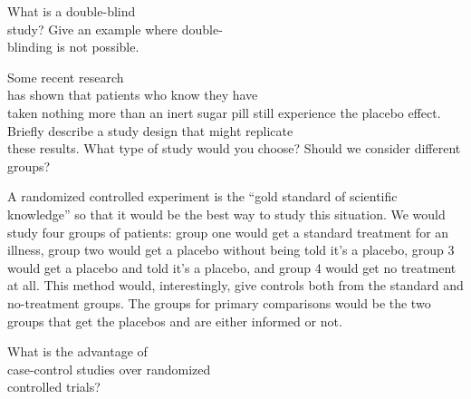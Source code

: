 \documentclass[11pt]{book}\usepackage[]{graphicx}\usepackage[]{color}
\begin{document}
\begin{exercises}
\begin{solution}
	\end{solution}

  \begin{exercise} %

What is a double-blind \\ study?  Give an example where double- \\ blinding is not possible.

    \end{exercise}
%

  \begin{exercise} %

Some recent research \\ has  shown that patients who know they have \\ taken nothing more than an inert sugar pill still experience the placebo effect. Briefly describe a study design that might replicate \\ these results. What type of study would you choose? Should we consider different \\ groups?
  \end{exercise}
  \begin{solution}  %

A randomized controlled experiment is the ``gold standard of scientific knowledge'' so that it would be the best way to study this situation. We would study four groups of patients: group one would get a standard treatment for an illness, group two would get a placebo without being told it's a placebo, group 3 would get a placebo and told it's a placebo, and group 4 would get no treatment at all. This method would, interestingly, give controls both from the standard and no-treatment groups. The groups for primary comparisons would be the two groups that get the placebos and are either informed or not.

  \end{solution}

  \begin{exercise} %

What is the advantage of \\ case-control studies over randomized \\ controlled trials?

  \end{exercise}
%


\end{exercises}
\end{document}
